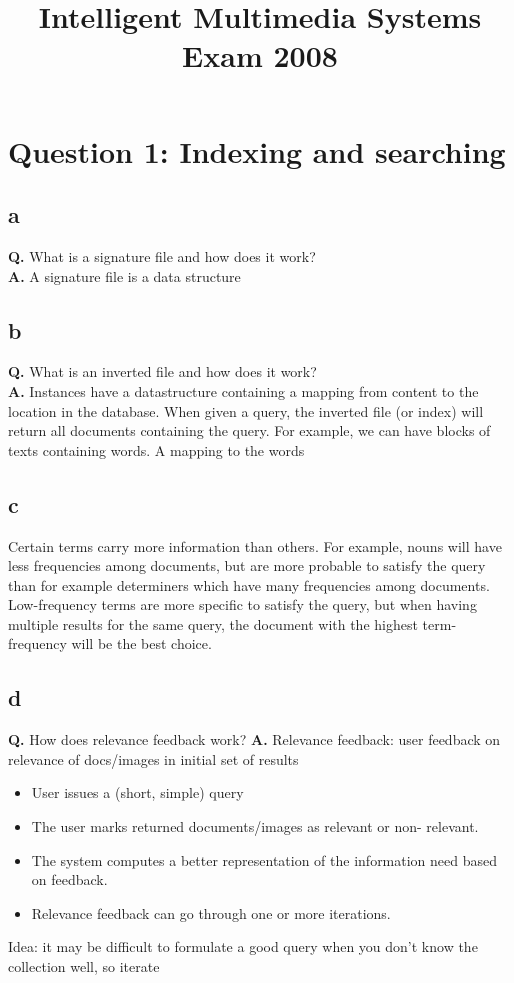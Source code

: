 \documentclass[a4paper,11pt]{article}
\title{Intelligent Multimedia Systems \\ Exam 2008}
\newcommand{\tbf}{\textbf}
\begin{document}
	\maketitle
	\section*{Question 1: Indexing and searching}
	
	\subsection*{a}
	\tbf{Q.} What is a signature file and how does it work? \\
	\tbf{A.} A signature file is a data structure 
	
	\subsection*{b}
	\tbf{Q.} What is an inverted file and how does it work? \\
	\tbf{A.} Instances have a datastructure containing a mapping from content to the location in the database. When given a query, the inverted file (or index) will return all documents containing the query. For example, we can have blocks of texts containing words. A mapping to the words
	
	\subsection*{c} Certain terms carry more information than others. For example, nouns will have less frequencies among documents, but are more probable to satisfy the query than for example determiners which have many frequencies among documents. Low-frequency terms are more specific to satisfy the query, but when having multiple results for the same query, the document with the highest term-frequency will be the best choice.
	
	\subsection*{d}
	\tbf{Q.} How does relevance feedback work?
	\tbf{A.} Relevance feedback: user feedback on relevance of docs/images in initial set of results
	\begin{itemize}
		\item User issues a (short, simple) query
		\item The user marks returned documents/images as relevant or non- relevant.
		\item The system computes a better representation of the information need based on feedback.
		\item Relevance feedback can go through one or more iterations.
	\end{itemize}
	Idea: it may be difficult to formulate a good query when you don't know the collection well, so iterate
	
\end{document}
